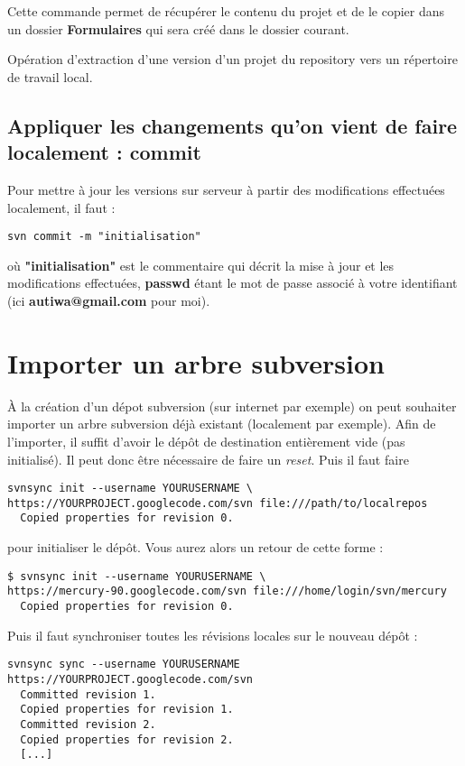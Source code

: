 \documentclass[a4paper,twoside]{article}
\begin{document}
Cette commande permet de récupérer le contenu du projet et de le copier dans un dossier \textbf{Formulaires} qui sera créé dans le dossier courant.

\begin{definition}[Checkout]
Opération d'extraction d'une version d'un projet du repository vers un répertoire de travail local.
\end{definition}


\subsection{Appliquer les changements qu'on vient de faire localement : commit}

Pour mettre à jour les versions sur serveur à partir des modifications effectuées localement, il faut : 
\begin{verbatim}
svn commit -m "initialisation"
\end{verbatim}
où \textbf{"initialisation"} est le commentaire qui décrit la mise à jour et les modifications effectuées, \textbf{passwd} étant le mot de passe associé à votre identifiant (ici \textbf{autiwa@gmail.com} pour moi).


\section{Importer un arbre subversion}
À la création d'un dépot subversion (sur internet par exemple) on peut souhaiter importer un arbre subversion déjà existant (localement par exemple). Afin de l'importer, il suffit d'avoir le dépôt de destination entièrement vide (pas initialisé). Il peut donc être nécessaire de faire un \emph{reset}. Puis il faut faire 
\begin{verbatim}
svnsync init --username YOURUSERNAME \
https://YOURPROJECT.googlecode.com/svn file:///path/to/localrepos
  Copied properties for revision 0.
\end{verbatim}
pour initialiser le dépôt. Vous aurez alors un retour de cette forme : 
\begin{verbatim}
$ svnsync init --username YOURUSERNAME \
https://mercury-90.googlecode.com/svn file:///home/login/svn/mercury
  Copied properties for revision 0.
\end{verbatim}

Puis il faut synchroniser toutes les révisions locales sur le nouveau dépôt : 
\begin{verbatim}
svnsync sync --username YOURUSERNAME https://YOURPROJECT.googlecode.com/svn
  Committed revision 1.
  Copied properties for revision 1.
  Committed revision 2.
  Copied properties for revision 2.
  [...]
\end{verbatim}
\end{document}
